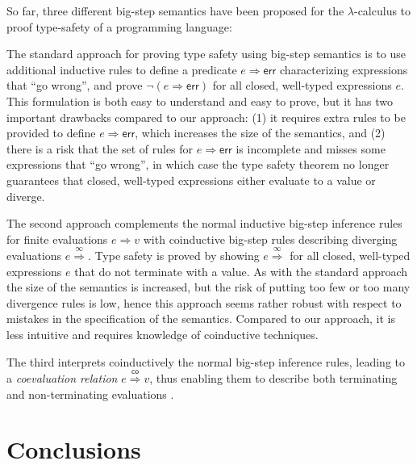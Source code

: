 \documentclass[12pt,a2paper,draft]{article}
\begin{document}
So far, three different big-step semantics have been proposed for the $\lambda$-calculus to proof
type-safety of a programming language:

The standard approach \cite{Tofte87} for proving type safety using big-step semantics is to use
additional inductive rules to define a predicate $e \Rightarrow \textsf{err}$ characterizing expressions that
``go wrong'', and prove $\neg(e \Rightarrow \textsf{err})$ for all closed,
well-typed expressions $e$. This formulation is both easy to understand and easy to prove, but
it has two important drawbacks compared to our approach:
(1) it requires extra rules to be provided to define $e \Rightarrow \textsf{err}$,
which increases the size of the semantics, and (2) there is a risk that the set of rules for
$e \Rightarrow \textsf{err}$ is incomplete and misses some expressions that ``go wrong'',
in which case the type safety theorem no longer guarantees that closed, well-typed expressions
either evaluate to a value or diverge.

The second approach \cite{CousotCousot07,LeroyGrall09} complements the normal inductive big-step
inference rules for finite evaluations $e \Rightarrow v$ with coinductive big-step rules describing
diverging evaluations $e \stackrel{\infty}{\Rightarrow}$. Type safety is proved by showing
$e \stackrel{\infty}{\Rightarrow}$ for all closed, well-typed expressions $e$ that do not terminate
with a value. As with the standard approach the size of the semantics is increased, but the risk of
putting too few or too many divergence rules is low, hence this approach seems rather robust with
respect to mistakes in the specification of the semantics. Compared to our approach, it is less
intuitive and requires knowledge of coinductive techniques.

The third interprets coinductively the normal big-step inference rules, leading to a \emph{coevaluation
relation} $e \stackrel{\mathsf{co}}{\Rightarrow} v$, thus enabling them to describe both terminating
and non-terminating evaluations \cite{LeroyGrall09}.


\section{Conclusions}




\end{document}
